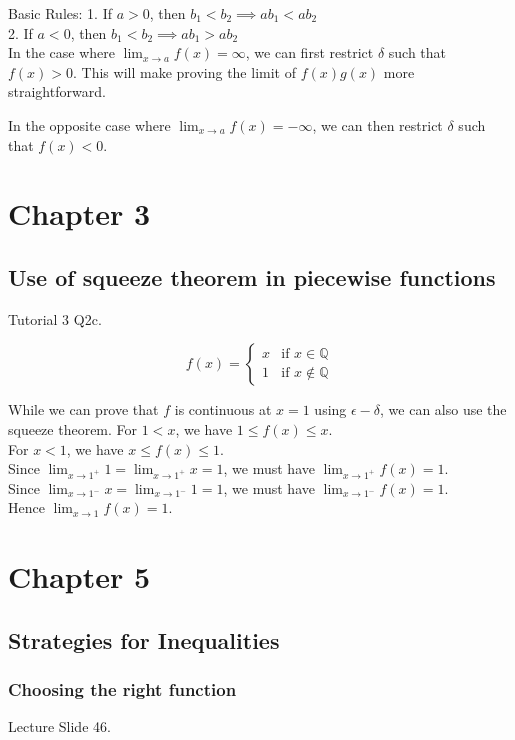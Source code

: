 \documentclass{article}
\begin{document}
Basic Rules:
1. If $a>0$, then $b_1<b_2 \implies ab_1<ab_2$\\
2. If $a<0$, then $b_1<b_2 \implies ab_1>ab_2$\\

In the case where $\lim_{x\rightarrow a}f(x)=\infty$, we can first restrict $\delta$ such that $f(x)>0$. This will make proving the limit of $f(x)g(x)$ more straightforward.

In the opposite case where $\lim_{x\rightarrow a}f(x)=-\infty$, we can then restrict $\delta$ such that $f(x)<0$.

\section{Chapter 3}
\subsection{Use of squeeze theorem in piecewise functions}
Tutorial 3 Q2c.

$$f(x)=
\begin{cases}
x &\text{if }x\in \mathbb{Q}\\
1 &\text{if }x\notin \mathbb{Q}
\end{cases}
$$

While we can prove that $f$ is continuous at $x=1$ using $\epsilon-\delta$, we can also use the squeeze theorem.
For $1<x$, we have $1\leq f(x)\leq x$.\\
For $x<1$, we have $x\leq f(x)\leq 1$.\\
Since $\lim_{x\rightarrow 1^+}1=\lim_{x\rightarrow 1^+}x=1$, we must have $\lim_{x\rightarrow 1^+}f(x)=1$.\\
Since $\lim_{x\rightarrow 1^-}x=\lim_{x\rightarrow 1^-}1=1$, we must have $\lim_{x\rightarrow 1^-}f(x)=1$.\\
Hence $\lim_{x\rightarrow 1}f(x)=1$.

\section{Chapter 5}
\subsection{Strategies for Inequalities}
\subsubsection{Choosing the right function}
Lecture Slide 46.
\end{document}
